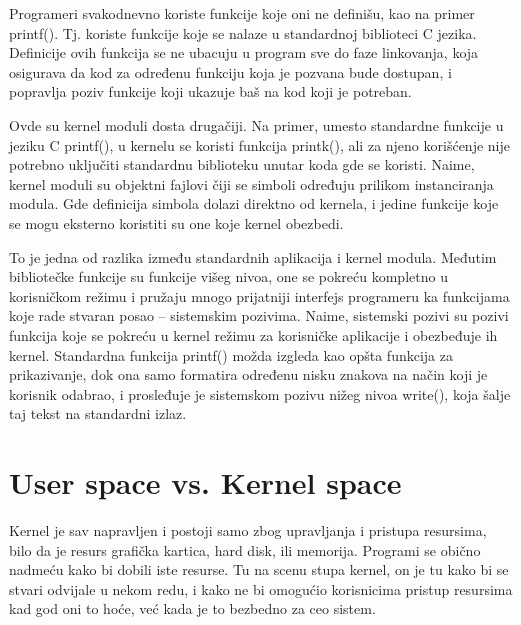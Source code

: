 \documentclass[a4paper, 12pt, diplomski]{etf}
\begin{document}
	Programeri svakodnevno koriste funkcije koje oni ne definišu, kao na primer printf(). Tj. koriste funkcije koje se nalaze u standardnoj biblioteci C jezika. Definicije ovih funkcija se ne ubacuju u program sve do faze linkovanja, koja osigurava da kod za određenu funkciju koja je pozvana bude dostupan, i popravlja poziv funkcije koji ukazuje baš na kod koji je potreban.

	Ovde su kernel moduli dosta drugačiji. Na primer, umesto standardne funkcije u jeziku C printf(), u kernelu se koristi funkcija printk(), ali za njeno korišćenje nije potrebno uključiti standardnu biblioteku unutar koda gde se koristi. Naime, kernel moduli su objektni fajlovi čiji se simboli određuju prilikom instanciranja modula. Gde definicija simbola dolazi direktno od kernela, i jedine funkcije koje se mogu eksterno koristiti su one koje kernel obezbedi.

	To je jedna od razlika između standardnih aplikacija i kernel modula. Međutim bibliotečke funkcije su funkcije višeg nivoa, one se pokreću kompletno u korisničkom režimu i pružaju mnogo prijatniji interfejs programeru ka funkcijama koje rade stvaran posao – sistemskim pozivima. Naime, sistemski pozivi su pozivi funkcija koje se pokreću u kernel režimu za korisničke aplikacije i obezbeđuje ih kernel. Standardna funkcija printf() možda izgleda kao opšta funkcija za prikazivanje, dok ona samo formatira određenu nisku znakova na način koji je korisnik odabrao, i prosleđuje je sistemskom pozivu nižeg nivoa write(), koja šalje taj tekst na standardni izlaz.

	\section{User space vs. Kernel space}

	Kernel je sav napravljen i postoji samo zbog upravljanja i pristupa resursima, bilo da je resurs grafička kartica, hard disk, ili memorija. Programi se obično nadmeću kako bi dobili iste resurse. Tu na scenu stupa kernel, on je tu kako bi se stvari odvijale u nekom redu, i kako ne bi omogućio korisnicima pristup resursima kad god oni to hoće, već kada je to bezbedno za ceo sistem.
\end{document}

